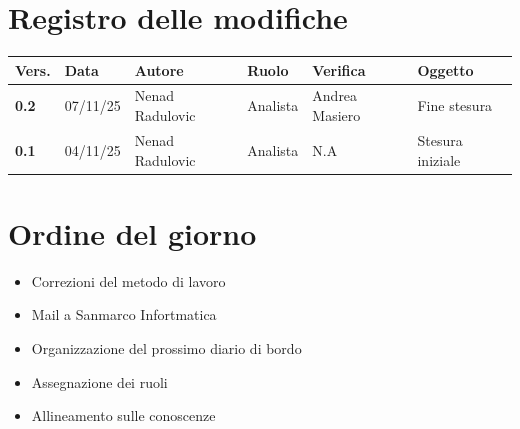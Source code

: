 \documentclass[a4paper,12pt]{article}
\begin{document}


\newpage
\section*{Registro delle modifiche}

\begin{table}[h!]
    \begin{tabularx}{\textwidth}{|l|l|l|l|X|X|}
        \hline
        \textbf{Vers.} & \textbf{Data} & \textbf{Autore} & \textbf{Ruolo} & \textbf{Verifica} & \textbf{Oggetto} \\
        \hline
        \textbf{0.2} & 07/11/25 & Nenad Radulovic & Analista & Andrea Masiero & Fine stesura \\
        \hline
        \textbf{0.1} & 04/11/25 & Nenad Radulovic & Analista & N.A & Stesura iniziale \\
       \hline
    \end{tabularx}
\end{table}

\newpage
\tableofcontents
\newpage

\section{Ordine del giorno}
\begin{itemize}
    \item Correzioni del metodo di lavoro
    \item Mail a Sanmarco Infortmatica
    \item Organizzazione del prossimo diario di bordo
    \item Assegnazione dei ruoli
    \item Allineamento sulle conoscenze
\end{itemize}
\end{document}
